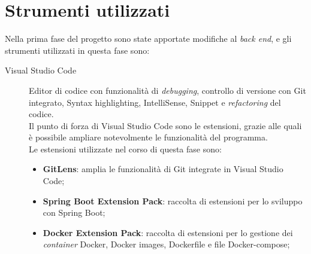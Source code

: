 \section{Strumenti utilizzati}
Nella prima fase del progetto sono state apportate modifiche al \textit{back
      end}, e gli strumenti utilizzati in questa fase sono:
\begin{description}
      \item[Visual Studio Code] Editor di codice con
            funzionalità di \textit{debugging}, controllo di versione con Git
            integrato,
            Syntax highlighting, IntelliSense,
            Snippet e \textit{refactoring} del codice.\\
            Il punto di forza di Visual Studio Code sono le estensioni, grazie
            alle quali è possibile ampliare notevolmente le funzionalità del
            programma.\\
            Le estensioni utilizzate nel corso di questa fase sono:
            \begin{itemize}
                  \item \textbf{GitLens}: amplia le funzionalità di Git
                        integrate in
                        Visual Studio Code;
                  \item \textbf{Spring Boot Extension Pack}: raccolta di
                        estensioni per lo sviluppo con Spring Boot;

                  \item \textbf{Docker Extension Pack}: raccolta di estensioni
                        per lo
                        gestione dei \textit{container} Docker, Docker images,
                        Dockerfile e
                        file
                        Docker-compose;


\end{itemize}
\end{description}
